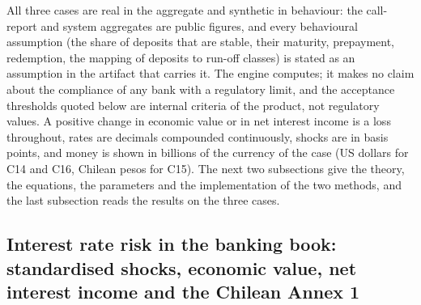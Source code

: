 All three cases are real in the aggregate and synthetic in behaviour: the call-report and system aggregates are public figures, and every behavioural assumption (the share of deposits that are stable, their maturity, prepayment, redemption, the mapping of deposits to run-off classes) is stated as an assumption in the artifact that carries it. The engine computes; it makes no claim about the compliance of any bank with a regulatory limit, and the acceptance thresholds quoted below are internal criteria of the product, not regulatory values. A positive change in economic value or in net interest income is a loss throughout, rates are decimals compounded continuously, shocks are in basis points, and money is shown in billions of the currency of the case (US dollars for C14 and C16, Chilean pesos for C15). The next two subsections give the theory, the equations, the parameters and the implementation of the two methods, and the last subsection reads the results on the three cases.

\subsection{Interest rate risk in the banking book: standardised shocks, economic value, net interest income and the Chilean Annex 1}
\label{sec:m22}

